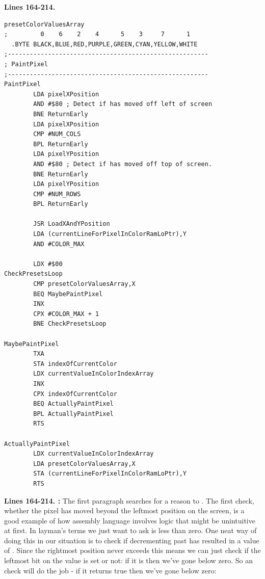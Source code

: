 \clearpage
\textbf{Lines 164-214. }
\begin{lstlisting}[caption=Where the painting is actually done.]
presetColorValuesArray
;         0    6    2    4      5    3     7      1
  .BYTE BLACK,BLUE,RED,PURPLE,GREEN,CYAN,YELLOW,WHITE
;-------------------------------------------------------
; PaintPixel
;-------------------------------------------------------
PaintPixel   
        LDA pixelXPosition
        AND #$80 ; Detect if has moved off left of screen
        BNE ReturnEarly
        LDA pixelXPosition
        CMP #NUM_COLS
        BPL ReturnEarly
        LDA pixelYPosition
        AND #$80 ; Detect if has moved off top of screen.
        BNE ReturnEarly
        LDA pixelYPosition
        CMP #NUM_ROWS
        BPL ReturnEarly

        JSR LoadXAndYPosition
        LDA (currentLineForPixelInColorRamLoPtr),Y
        AND #COLOR_MAX

        LDX #$00
CheckPresetsLoop   
        CMP presetColorValuesArray,X
        BEQ MaybePaintPixel
        INX 
        CPX #COLOR_MAX + 1
        BNE CheckPresetsLoop

MaybePaintPixel   
        TXA 
        STA indexOfCurrentColor
        LDX currentValueInColorIndexArray
        INX 
        CPX indexOfCurrentColor
        BEQ ActuallyPaintPixel
        BPL ActuallyPaintPixel
        RTS 

ActuallyPaintPixel   
        LDX currentValueInColorIndexArray
        LDA presetColorValuesArray,X
        STA (currentLineForPixelInColorRamLoPtr),Y
        RTS 
\end{lstlisting}
\clearpage

\textbf{Lines 164-214. :} The first paragraph searches for a reason to . The first
check, whether the pixel has moved beyond the leftmost position on the screen, is a good example of how assembly language involves
logic that might be unintuitive at first. In layman's terms we just want to ask is  less than zero. One neat
way of doing this in our situation is to check if decrementing past  has resulted in a value of . Since
the rightmost position never exceeds  this means we can just check if the leftmost bit on the value is set or not: if 
it is then we've gone below zero. So an  check will do the job - if it returns true then we've gone below zero:

